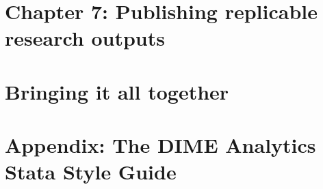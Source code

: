 
\chapter{Chapter 7: Publishing replicable research outputs}
\label{ch:7}




\chapter{Bringing it all together}




\chapter{Appendix: The DIME Analytics Stata Style Guide}
\label{ap:1}





\backmatter




\printindex %


